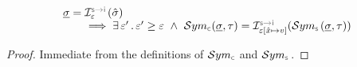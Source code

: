 \begin{lemma}\label{lemma:symbvalue:soundiness}
$$
\begin{array}{l}
\istate = \interpret{\symbinst}{\senv}(\sstate) \\ \qquad
   \implies \exists \, \senv' \, . \,  \senv' \fextends \senv \ \wedge \ \absmakesymbolicrule{\concrete}{\istate, \jtype} 
              = \interpret{\symbinst}{\senv[\svar \mapsto \val]}(\absmakesymbolicrule{\symbolic}{\istate, \jtype})
\end{array}
$$
 \end{lemma}
 \begin{proof}
 Immediate from the definitions of $\absmakesymbolic_{\concrete}$ and $\absmakesymbolic_{\symbolic}$.  
 \end{proof}


